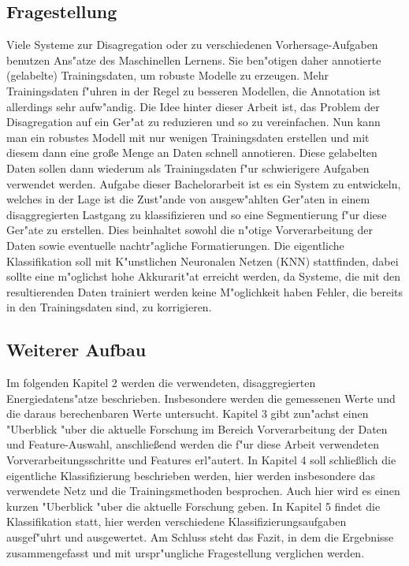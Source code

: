 \subsection{Fragestellung}
\label{Fragestellung}
 	Viele Systeme zur Disagregation oder zu verschiedenen Vorhersage-Aufgaben benutzen Ans"atze des Maschinellen Lernens. Sie ben"otigen daher annotierte (gelabelte) Trainingsdaten, um robuste Modelle zu erzeugen. Mehr Trainingsdaten f"uhren in der Regel zu besseren Modellen, die Annotation ist allerdings sehr aufw"andig. Die Idee hinter dieser Arbeit ist, das Problem der Disagregation auf ein Ger"at zu reduzieren und so zu vereinfachen. Nun kann man ein robustes Modell mit nur wenigen Trainingsdaten erstellen und mit diesem dann eine gro{\ss}e Menge an Daten schnell annotieren. Diese gelabelten Daten sollen dann wiederum als Trainingsdaten f"ur schwierigere Aufgaben verwendet werden. 
	Aufgabe dieser Bachelorarbeit ist es ein System zu entwickeln, welches in der Lage ist die Zust"ande von ausgew"ahlten Ger"aten in einem disaggregierten Lastgang zu klassifizieren und so eine Segmentierung f"ur diese Ger"ate zu erstellen. Dies beinhaltet sowohl die n"otige Vorverarbeitung der Daten sowie eventuelle nachtr"agliche Formatierungen. Die eigentliche Klassifikation soll mit K"unstlichen Neuronalen Netzen (KNN) stattfinden, dabei sollte eine m"oglichst hohe Akkurarit"at erreicht werden, da Systeme, die mit den resultierenden Daten trainiert werden keine M"oglichkeit haben Fehler, die bereits in den Trainingsdaten sind, zu korrigieren. 

\subsection{Weiterer Aufbau}
\label{Weiterer Aufbau}
	Im folgenden Kapitel 2 werden die verwendeten, disaggregierten Energiedatens"atze beschrieben. Insbesondere werden die gemessenen Werte und die daraus berechenbaren Werte untersucht. 
	Kapitel 3 gibt zun"achst einen "Uberblick "uber die aktuelle Forschung im Bereich Vorverarbeitung der Daten und Feature-Auswahl, anschlie{\ss}end werden die f"ur diese Arbeit verwendeten Vorverarbeitungsschritte und Features erl"autert.
	In Kapitel 4 soll schlie{\ss}lich die eigentliche Klassifizierung beschrieben werden, hier werden insbesondere das verwendete Netz und die Trainingsmethoden besprochen. Auch hier wird es einen kurzen "Uberblick "uber die aktuelle Forschung geben.
	In Kapitel 5 findet die Klassifikation statt, hier werden verschiedene Klassifizierungsaufgaben ausgef"uhrt und ausgewertet. 
	Am Schluss steht das Fazit, in dem die Ergebnisse zusammengefasst und mit urspr"ungliche Fragestellung verglichen werden. 